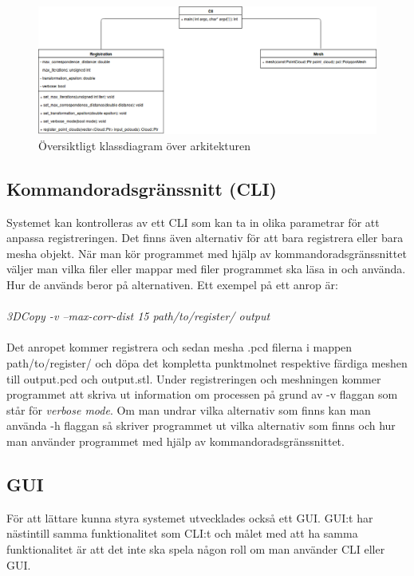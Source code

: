 \begin{figure}[H]
	\centering
	\includegraphics[width=130mm]{figures/klassdiagram.png}
	\caption{Översiktligt klassdiagram över arkitekturen}
	\label{fig:class_diagram}
\end{figure}

\subsection{Kommandoradsgränssnitt (CLI)}

Systemet kan kontrolleras av ett CLI som kan ta in olika parametrar för att anpassa registreringen. Det finns även alternativ för att bara registrera eller bara mesha objekt. När man kör programmet med hjälp av kommandoradsgränssnittet väljer man vilka filer eller mappar med filer programmet ska läsa in och använda. Hur de används beror på alternativen. Ett exempel på ett anrop är:\\\\
\textit{3DCopy -v --max-corr-dist 15 path/to/register/ output}\\\\
Det anropet kommer registrera och sedan mesha .pcd filerna i mappen path/to/register/ och döpa det kompletta punktmolnet respektive färdiga meshen till output.pcd och output.stl. Under registreringen och meshningen kommer programmet att skriva ut information om processen på grund av -v flaggan som står för \textit{verbose mode}. Om man undrar vilka alternativ som finns kan man använda -h flaggan så skriver programmet ut vilka alternativ som finns och hur man använder programmet med hjälp av kommandoradsgränssnittet. 

\subsection{GUI}
För att lättare kunna styra systemet utvecklades också ett GUI. GUI:t har nästintill samma funktionalitet som CLI:t och målet med att ha samma funktionalitet är att det inte ska spela någon roll om man använder CLI eller GUI.

